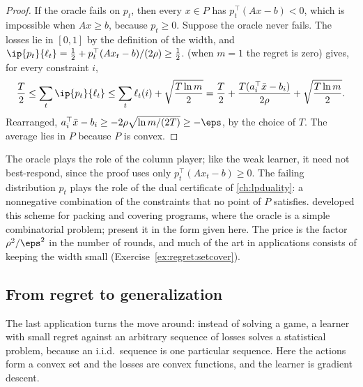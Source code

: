 \begin{refsection}
\begin{proof}
If the oracle fails on $p_t$, then every $x\in P$ has $p_t^\top(Ax-b)<0$, which is impossible when $Ax\ge b$, because $p_t\ge0$. Suppose the oracle never fails. The losses lie in $[0,1]$ by the definition of the width, and $\ip{p_t}{\ell_t}=\frac12+p_t^\top(Ax_t-b)/(2\rho)\ge\frac12$.  (when $m=1$ the regret is zero) gives, for every constraint $i$,
\[
\frac T2\le\sum_t\ip{p_t}{\ell_t}\le\sum_t\ell_t(i)+\sqrt{\frac{T\ln m}2}=\frac T2+\frac{T(a_i^\top\bar x-b_i)}{2\rho}+\sqrt{\frac{T\ln m}2} .
\]
Rearranged, $a_i^\top\bar x-b_i\ge-2\rho\sqrt{\ln m/(2T)}\ge-\eps$, by the choice of $T$. The average lies in $P$ because $P$ is convex.
\end{proof}

The oracle plays the role of the column player; like the weak learner, it need not best-respond, since the proof uses only $p_t^\top(Ax_t-b)\ge0$. The failing distribution $p_t$ plays the role of the dual certificate of \cref{ch:lpduality}: a nonnegative combination of the constraints that no point of $P$ satisfies. \textcite{PlotkinShmoysTardos1995} developed this scheme for packing and covering programs, where the oracle is a simple combinatorial problem; \textcite{AroraHazanKale2012} present it in the form given here. The price is the factor $\rho^2/\eps^2$ in the number of rounds, and much of the art in applications consists of keeping the width small (Exercise~\ref{ex:regret:setcover}).

\subsection{From regret to generalization}

The last application turns the move around: instead of solving a game, a learner with small regret against an arbitrary sequence of losses solves a statistical problem, because an i.i.d.\ sequence is one particular sequence. Here the actions form a convex set and the losses are convex functions, and the learner is gradient descent.


\end{refsection}
